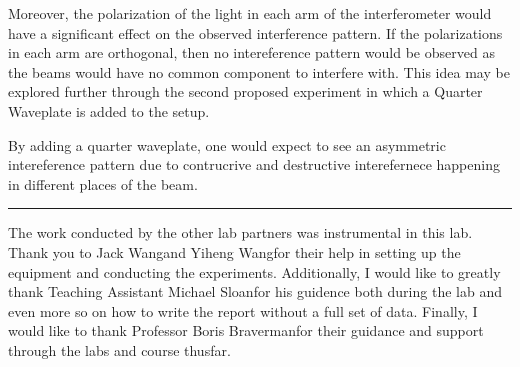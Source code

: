 \documentclass[aip, cp, amsmath, amssymb, reprint]{revtex4-2}
\newcommand\advname{Boris Braverman\space} %
\newcommand\taname{Michael Sloan\space} %
\newcommand\lponename{Jack Wang\space}
\newcommand\lptwoname{Yiheng Wang\space}
\begin{document}
        Moreover, the polarization of the light in each arm of the interferometer would have a significant effect on the observed interference pattern. If the polarizations in each arm are orthogonal, then no intereference pattern would be observed as the beams would have no common component to interfere with. This idea may be explored further through the second proposed experiment in which a Quarter Waveplate is added to the setup. 

        By adding a quarter waveplate, one would expect to see an asymmetric intereference pattern due to contrucrive and destructive interefernece happening in different places of the beam. 


    \onecolumngrid
    \begin{center}
        \vspace{0.8cm}
        \noindent\rule{0.9\textwidth}{0.5pt}
    \end{center}
    \begin{acknowledgments}
        The work conducted by the other lab partners was instrumental in this lab. Thank you to \lponename and \lptwoname for their help in setting up the equipment and conducting the experiments. Additionally, I would like to greatly thank Teaching Assistant \taname for his guidence both during the lab and even more so on how to write the report without a full set of data. Finally, I would like to thank Professor \advname for their guidance and support through the labs and course thusfar.
    \end{acknowledgments}




% 
\end{document}
